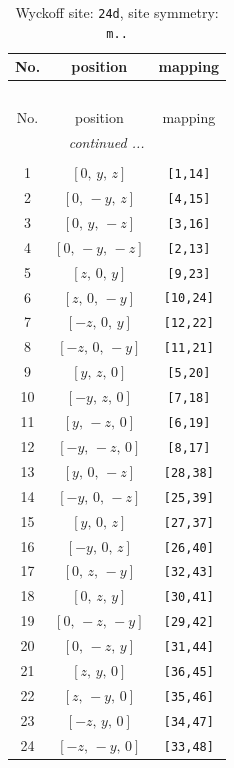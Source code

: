 \documentclass[fleqn,8pt]{jsarticle}
\begin{document}
\begin{longtable}{ccc}
\caption{Wyckoff site: {\tt 24d}, site symmetry: {\tt m..}}
 \\
 \hline \hline
No. & position & mapping \\ \hline \endfirsthead

\multicolumn{2}{l}{\tablename\ \thetable{}} \\
 \hline \hline
No. & position & mapping \\ \hline \endhead

 \hline \hline
\multicolumn{2}{r}{\footnotesize\it continued ...} \\ \endfoot

 \hline \hline
\multicolumn{2}{r}{} \\ \endlastfoot

1 & $\left[ 0,\, y,\, z \right]$ & {\tt [1,14]} \\ \hline
2 & $\left[ 0,\, - y,\, z \right]$ & {\tt [4,15]} \\ \hline
3 & $\left[ 0,\, y,\, - z \right]$ & {\tt [3,16]} \\ \hline
4 & $\left[ 0,\, - y,\, - z \right]$ & {\tt [2,13]} \\ \hline
5 & $\left[ z,\, 0,\, y \right]$ & {\tt [9,23]} \\ \hline
6 & $\left[ z,\, 0,\, - y \right]$ & {\tt [10,24]} \\ \hline
7 & $\left[ - z,\, 0,\, y \right]$ & {\tt [12,22]} \\ \hline
8 & $\left[ - z,\, 0,\, - y \right]$ & {\tt [11,21]} \\ \hline
9 & $\left[ y,\, z,\, 0 \right]$ & {\tt [5,20]} \\ \hline
10 & $\left[ - y,\, z,\, 0 \right]$ & {\tt [7,18]} \\ \hline
11 & $\left[ y,\, - z,\, 0 \right]$ & {\tt [6,19]} \\ \hline
12 & $\left[ - y,\, - z,\, 0 \right]$ & {\tt [8,17]} \\ \hline
13 & $\left[ y,\, 0,\, - z \right]$ & {\tt [28,38]} \\ \hline
14 & $\left[ - y,\, 0,\, - z \right]$ & {\tt [25,39]} \\ \hline
15 & $\left[ y,\, 0,\, z \right]$ & {\tt [27,37]} \\ \hline
16 & $\left[ - y,\, 0,\, z \right]$ & {\tt [26,40]} \\ \hline
17 & $\left[ 0,\, z,\, - y \right]$ & {\tt [32,43]} \\ \hline
18 & $\left[ 0,\, z,\, y \right]$ & {\tt [30,41]} \\ \hline
19 & $\left[ 0,\, - z,\, - y \right]$ & {\tt [29,42]} \\ \hline
20 & $\left[ 0,\, - z,\, y \right]$ & {\tt [31,44]} \\ \hline
21 & $\left[ z,\, y,\, 0 \right]$ & {\tt [36,45]} \\ \hline
22 & $\left[ z,\, - y,\, 0 \right]$ & {\tt [35,46]} \\ \hline
23 & $\left[ - z,\, y,\, 0 \right]$ & {\tt [34,47]} \\ \hline
24 & $\left[ - z,\, - y,\, 0 \right]$ & {\tt [33,48]} \\
\end{longtable}
\end{document}
